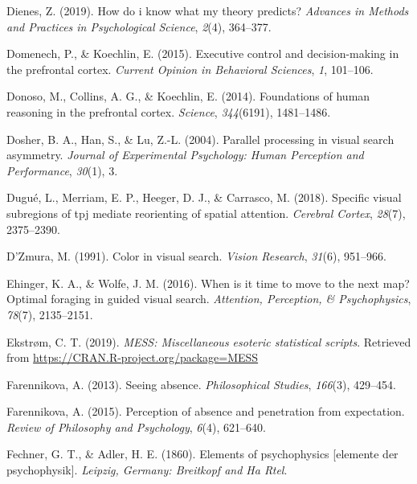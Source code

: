 \documentclass[12pt,twoside]{reedthesis}
\begin{document}
\leavevmode\hypertarget{ref-dienes2019know}{}%
Dienes, Z. (2019). How do i know what my theory predicts? \emph{Advances in Methods and Practices in Psychological Science}, \emph{2}(4), 364--377.

\leavevmode\hypertarget{ref-domenech2015executive}{}%
Domenech, P., \& Koechlin, E. (2015). Executive control and decision-making in the prefrontal cortex. \emph{Current Opinion in Behavioral Sciences}, \emph{1}, 101--106.

\leavevmode\hypertarget{ref-donoso2014foundations}{}%
Donoso, M., Collins, A. G., \& Koechlin, E. (2014). Foundations of human reasoning in the prefrontal cortex. \emph{Science}, \emph{344}(6191), 1481--1486.

\leavevmode\hypertarget{ref-dosher2004parallel}{}%
Dosher, B. A., Han, S., \& Lu, Z.-L. (2004). Parallel processing in visual search asymmetry. \emph{Journal of Experimental Psychology: Human Perception and Performance}, \emph{30}(1), 3.

\leavevmode\hypertarget{ref-dugue2018specific}{}%
Dugué, L., Merriam, E. P., Heeger, D. J., \& Carrasco, M. (2018). Specific visual subregions of tpj mediate reorienting of spatial attention. \emph{Cerebral Cortex}, \emph{28}(7), 2375--2390.

\leavevmode\hypertarget{ref-d1991color}{}%
D'Zmura, M. (1991). Color in visual search. \emph{Vision Research}, \emph{31}(6), 951--966.

\leavevmode\hypertarget{ref-ehinger2016time}{}%
Ehinger, K. A., \& Wolfe, J. M. (2016). When is it time to move to the next map? Optimal foraging in guided visual search. \emph{Attention, Perception, \& Psychophysics}, \emph{78}(7), 2135--2151.

\leavevmode\hypertarget{ref-R-MESS}{}%
Ekstrøm, C. T. (2019). \emph{MESS: Miscellaneous esoteric statistical scripts}. Retrieved from \url{https://CRAN.R-project.org/package=MESS}

\leavevmode\hypertarget{ref-farennikova2013seeing}{}%
Farennikova, A. (2013). Seeing absence. \emph{Philosophical Studies}, \emph{166}(3), 429--454.

\leavevmode\hypertarget{ref-farennikova2015perception}{}%
Farennikova, A. (2015). Perception of absence and penetration from expectation. \emph{Review of Philosophy and Psychology}, \emph{6}(4), 621--640.

\leavevmode\hypertarget{ref-fechner1860elements}{}%
Fechner, G. T., \& Adler, H. E. (1860). Elements of psychophysics {[}elemente der psychophysik{]}. \emph{Leipzig, Germany: Breitkopf and Ha Rtel}.
\end{document}
